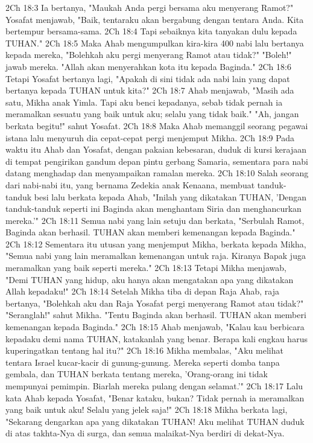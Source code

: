 2Ch 18:3  Ia bertanya, "Maukah Anda pergi bersama aku menyerang Ramot?" Yosafat menjawab, "Baik, tentaraku akan bergabung dengan tentara Anda. Kita bertempur bersama-sama.
2Ch 18:4  Tapi sebaiknya kita tanyakan dulu kepada TUHAN."
2Ch 18:5  Maka Ahab mengumpulkan kira-kira 400 nabi lalu bertanya kepada mereka, "Bolehkah aku pergi menyerang Ramot atau tidak?" "Boleh!" jawab mereka. "Allah akan menyerahkan kota itu kepada Baginda."
2Ch 18:6  Tetapi Yosafat bertanya lagi, "Apakah di sini tidak ada nabi lain yang dapat bertanya kepada TUHAN untuk kita?"
2Ch 18:7  Ahab menjawab, "Masih ada satu, Mikha anak Yimla. Tapi aku benci kepadanya, sebab tidak pernah ia meramalkan sesuatu yang baik untuk aku; selalu yang tidak baik." "Ah, jangan berkata begitu!" sahut Yosafat.
2Ch 18:8  Maka Ahab memanggil seorang pegawai istana lalu menyuruh dia cepat-cepat pergi menjemput Mikha.
2Ch 18:9  Pada waktu itu Ahab dan Yosafat, dengan pakaian kebesaran, duduk di kursi kerajaan di tempat pengirikan gandum depan pintu gerbang Samaria, sementara para nabi datang menghadap dan menyampaikan ramalan mereka.
2Ch 18:10  Salah seorang dari nabi-nabi itu, yang bernama Zedekia anak Kenaana, membuat tanduk-tanduk besi lalu berkata kepada Ahab, "Inilah yang dikatakan TUHAN, 'Dengan tanduk-tanduk seperti ini Baginda akan menghantam Siria dan menghancurkan mereka.'"
2Ch 18:11  Semua nabi yang lain setuju dan berkata, "Serbulah Ramot, Baginda akan berhasil. TUHAN akan memberi kemenangan kepada Baginda."
2Ch 18:12  Sementara itu utusan yang menjemput Mikha, berkata kepada Mikha, "Semua nabi yang lain meramalkan kemenangan untuk raja. Kiranya Bapak juga meramalkan yang baik seperti mereka."
2Ch 18:13  Tetapi Mikha menjawab, "Demi TUHAN yang hidup, aku hanya akan mengatakan apa yang dikatakan Allah kepadaku!"
2Ch 18:14  Setelah Mikha tiba di depan Raja Ahab, raja bertanya, "Bolehkah aku dan Raja Yosafat pergi menyerang Ramot atau tidak?" "Seranglah!" sahut Mikha. "Tentu Baginda akan berhasil. TUHAN akan memberi kemenangan kepada Baginda."
2Ch 18:15  Ahab menjawab, "Kalau kau berbicara kepadaku demi nama TUHAN, katakanlah yang benar. Berapa kali engkau harus kuperingatkan tentang hal itu?"
2Ch 18:16  Mikha membalas, "Aku melihat tentara Israel kucar-kacir di gunung-gunung. Mereka seperti domba tanpa gembala, dan TUHAN berkata tentang mereka, 'Orang-orang ini tidak mempunyai pemimpin. Biarlah mereka pulang dengan selamat.'"
2Ch 18:17  Lalu kata Ahab kepada Yosafat, "Benar kataku, bukan? Tidak pernah ia meramalkan yang baik untuk aku! Selalu yang jelek saja!"
2Ch 18:18  Mikha berkata lagi, "Sekarang dengarkan apa yang dikatakan TUHAN! Aku melihat TUHAN duduk di atas takhta-Nya di surga, dan semua malaikat-Nya berdiri di dekat-Nya.
